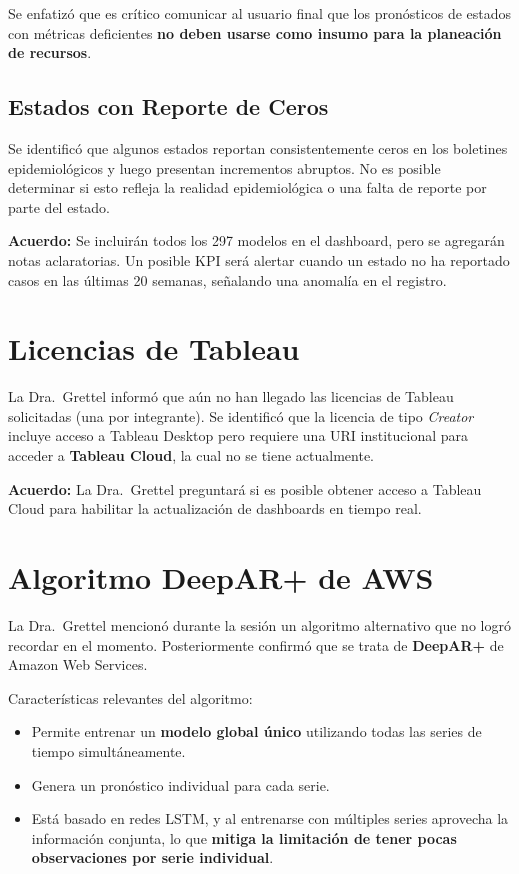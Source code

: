 \documentclass[11pt,letterpaper]{article}
\begin{document}
Se enfatizó que es crítico comunicar al usuario final que los pronósticos de estados con métricas deficientes \textbf{no deben usarse como insumo para la planeación de recursos}.

\subsection{Estados con Reporte de Ceros}

Se identificó que algunos estados reportan consistentemente ceros en los boletines epidemiológicos y luego presentan incrementos abruptos. No es posible determinar si esto refleja la realidad epidemiológica o una falta de reporte por parte del estado.

\textbf{Acuerdo:} Se incluirán todos los 297 modelos en el dashboard, pero se agregarán notas aclaratorias. Un posible KPI será alertar cuando un estado no ha reportado casos en las últimas 20 semanas, señalando una anomalía en el registro.

\section{Licencias de Tableau}

La Dra.\ Grettel informó que aún no han llegado las licencias de Tableau solicitadas (una por integrante). Se identificó que la licencia de tipo \textit{Creator} incluye acceso a Tableau Desktop pero requiere una URI institucional para acceder a \textbf{Tableau Cloud}, la cual no se tiene actualmente.

\textbf{Acuerdo:} La Dra.\ Grettel preguntará si es posible obtener acceso a Tableau Cloud para habilitar la actualización de dashboards en tiempo real.

\section{Algoritmo DeepAR+ de AWS}

La Dra.\ Grettel mencionó durante la sesión un algoritmo alternativo que no logró recordar en el momento. Posteriormente confirmó que se trata de \textbf{DeepAR+} de Amazon Web Services.

Características relevantes del algoritmo:
\begin{itemize}[leftmargin=2em]
    \item Permite entrenar un \textbf{modelo global único} utilizando todas las series de tiempo simultáneamente.
    \item Genera un pronóstico individual para cada serie.
    \item Está basado en redes LSTM, y al entrenarse con múltiples series aprovecha la información conjunta, lo que \textbf{mitiga la limitación de tener pocas observaciones por serie individual}.
\end{itemize}
\end{document}
